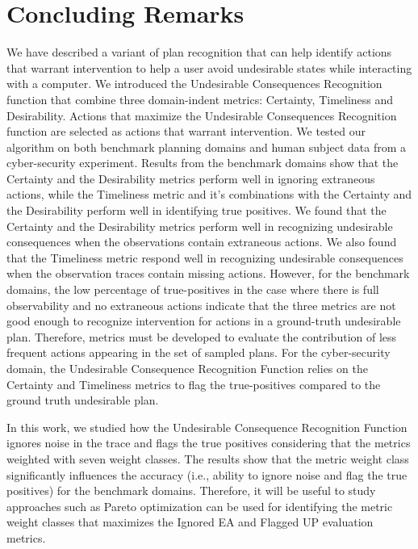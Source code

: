 \section{Concluding Remarks}
We have described a variant of plan recognition that can help identify actions that warrant intervention to help a user avoid undesirable states while interacting with a computer. 
We introduced the Undesirable Consequences Recognition function that combine three domain-indent metrics: Certainty, Timeliness and Desirability.
Actions that maximize the Undesirable Consequences Recognition function are selected as actions that warrant intervention.
We tested our algorithm on both benchmark planning domains and human subject data from a cyber-security experiment. 
Results from the benchmark domains show that the Certainty and the Desirability metrics perform well in ignoring extraneous actions, while the Timeliness metric and it's combinations with the Certainty and the Desirability perform well in identifying true positives. 
We found that the Certainty and the Desirability metrics perform well in recognizing undesirable consequences when the observations contain extraneous actions.
We also found that the Timeliness metric respond well in recognizing undesirable consequences when the observation traces contain missing actions.
However,  for the benchmark domains, the low percentage of true-positives in the case where there is full observability and no extraneous actions indicate that the three metrics are not good enough to recognize intervention for actions in a ground-truth undesirable plan.
Therefore, metrics must be developed to evaluate the contribution of less frequent actions appearing in the set of sampled plans.
For the cyber-security domain, the Undesirable Consequence Recognition Function relies on the Certainty and Timeliness metrics to flag the true-positives compared to the ground truth undesirable plan.

In this work, we studied how the Undesirable Consequence Recognition Function ignores noise in the trace and flags the true positives considering that the metrics weighted with seven weight classes.
The results show that the metric weight class significantly influences the accuracy (i.e., ability to ignore noise and flag the true positives) for the benchmark domains.
Therefore, it will be useful to study approaches such as Pareto optimization can be used for identifying the metric weight classes that maximizes the Ignored EA and Flagged UP evaluation metrics.

